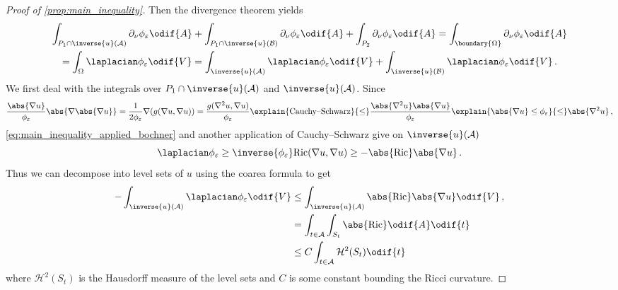 \documentclass[titlepage,numbers=noenddot,oneside,%
cleardoublepage=empty,paper=a4,fontsize=11pt,%
english,%
]{scrartcl}
\newcommand*{\mathcomma}{\,,}
\newcommand*{\mathfullstop}{\,.}
\newcommand{\Ricci}{\mathrm{Ric}} %
\begin{document}
{\begin{proof}[Proof of \cref{prop:main_inequality}]
            Then the divergence theorem yields
            \begin{multline}
                \int_{P_1\cap \inverse{u}(\mathcal{A})}\partial_\nu \phi_\varepsilon\odif{A}+\int_{P_1\cap \inverse{u}(\mathcal{B})}\partial_\nu \phi_\varepsilon\odif{A}+\int_{P_2}\partial_\nu \phi_\varepsilon\odif{A}=\int_{\boundary{\Omega}}\partial_\nu \phi_\varepsilon\odif{A}\\
                =\int_{\Omega}\laplacian \phi_\varepsilon\odif{V}=\int_{\inverse{u}(\mathcal{A})}\laplacian \phi_\varepsilon\odif{V}+\int_{\inverse{u}(\mathcal{B})}\laplacian \phi_\varepsilon\odif{V}\mathfullstop\label{eq:main_inequality_branching_point}
            \end{multline}
            We first deal with the integrals over \( P_1\cap \inverse{u}(\mathcal{A}) \) and \( \inverse{u}(\mathcal{A}) \). Since
            \begin{equation*}
                \frac{\abs{\nabla u}}{\phi_\varepsilon}\abs{\nabla \abs{\nabla u}}=\frac{1}{2\phi_\varepsilon}\nabla(g(\nabla u,\nabla u))=\frac{g(\nabla^2 u,\nabla u)}{\phi_\varepsilon}\explain{\text{Cauchy--Schwarz}}{\leq}\frac{\abs{\nabla^2 u}\abs{\nabla u}}{\phi_\varepsilon}\explain{\abs{\nabla u}\leq \phi_\varepsilon}{\leq} \abs{\nabla^2 u}\mathcomma
            \end{equation*}
            \cref{eq:main_inequality_applied_bochner} and another application of Cauchy--Schwarz give on \( \inverse{u}(\mathcal{A}) \)
            \begin{equation*}
                \laplacian\phi_\varepsilon\geq \inverse{\phi_\varepsilon}\Ricci(\nabla u, \nabla u)\geq -\abs{\Ricci}\abs{\nabla u}\mathfullstop
            \end{equation*}
            Thus we can decompose into level sets of \( u \) using the coarea formula to get
            \begin{equation}
                \begin{aligned}[t]
                    -\int_{\inverse{u}(\mathcal{A})}\laplacian\phi_\varepsilon\odif{V} & \leq \int_{\inverse{u}(\mathcal{A})}\abs{\Ricci}\abs{\nabla u}\odif{V} \\ 
                                                                                       & =\int_{t\in \mathcal{A}}\int_{S_t}\abs{\Ricci}\odif{A}\odif{t}         \\
                                                                                       & \leq C\int_{t\in \mathcal{A}}\mathcal{H}^2(S_t)\odif{t}
                \end{aligned}\mathcomma\label{eq:A_bounded}
            \end{equation}
            where \( \mathcal{H}^2(S_t) \) is the Hausdorff measure of the level sets and \( C \) is some constant bounding the Ricci curvature.
            

\end{proof}}
\end{document}
